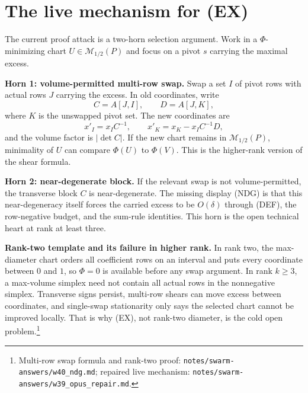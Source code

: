 \documentclass[11pt]{article}
\theoremstyle{plain}
\theoremstyle{definition}
\theoremstyle{remark}
\begin{document}
\section{The live mechanism for \textup{(EX)}}

The current proof attack is a two-horn selection argument.  Work in a
$\Phi$-minimizing chart $U\in\mathcal M_{1/2}(P)$ and focus on a pivot $s$
carrying the maximal excess.

\medskip\noindent
\textbf{Horn 1: volume-permitted multi-row swap.}  Swap a set $I$ of pivot rows
with actual rows $J$ carrying the excess.  In old coordinates, write
\[
C=A[J,I],\qquad D=A[J,K],
\]
where $K$ is the unswapped pivot set.  The new coordinates are
\[
x'_I=x_IC^{-1},\qquad x'_K=x_K-x_IC^{-1}D,
\]
and the volume factor is $|\det C|$.  If the new chart remains in
$\mathcal M_{1/2}(P)$, minimality of $U$ can compare $\Phi(U)$ to $\Phi(V)$.
This is the higher-rank version of the shear formula.

\medskip\noindent
\textbf{Horn 2: near-degenerate block.}  If the relevant swap is not
volume-permitted, the transverse block $C$ is near-degenerate.  The missing
display (NDG) is that this near-degeneracy itself forces the carried excess to
be $O(\delta)$ through (DEF), the row-negative budget, and the sum-rule
identities.  This horn is the open technical heart at rank at least three.

\medskip\noindent
\textbf{Rank-two template and its failure in higher rank.}  In rank two, the
max-diameter chart orders all coefficient rows on an interval and puts every
coordinate between $0$ and $1$, so $\Phi=0$ is available before any swap
argument.  In rank $k\ge3$, a max-volume simplex need not contain all actual
rows in the nonnegative simplex.  Transverse signs persist, multi-row shears
can move excess between coordinates, and single-swap stationarity only says the
selected chart cannot be improved locally.  That is why \textup{(EX)}, not
rank-two diameter, is the cold open problem.\footnote{Multi-row swap formula
and rank-two proof:
\texttt{notes/swarm-answers/w40\_ndg.md}; repaired live mechanism:
\texttt{notes/swarm-answers/w39\_opus\_repair.md}.}
\end{document}
